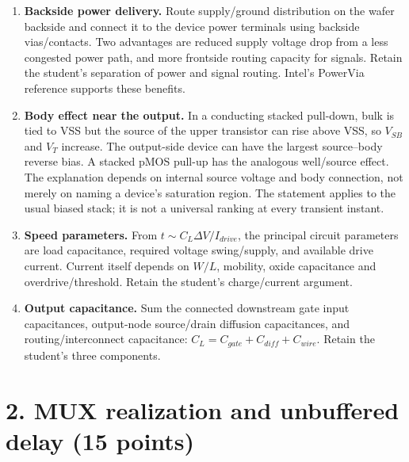\documentclass[10pt]{article}
\begin{document}
\begin{enumerate}[label=(\alph*),leftmargin=7mm,itemsep=6pt]
\item \textbf{Backside power delivery.} Route supply/ground distribution on the wafer backside and connect it to the device power terminals using backside vias/contacts. Two advantages are reduced supply voltage drop from a less congested power path, and more frontside routing capacity for signals. Retain the student's separation of power and signal routing. Intel's PowerVia reference supports these benefits.
\item \textbf{Body effect near the output.} In a conducting stacked pull-down, bulk is tied to VSS but the source of the upper transistor can rise above VSS, so $V_{SB}$ and $V_T$ increase. The output-side device can have the largest source--body reverse bias. A stacked pMOS pull-up has the analogous well/source effect. The explanation depends on internal source voltage and body connection, not merely on naming a device's saturation region. The statement applies to the usual biased stack; it is not a universal ranking at every transient instant.
\item \textbf{Speed parameters.} From $t\sim C_L\Delta V/I_{drive}$, the principal circuit parameters are load capacitance, required voltage swing/supply, and available drive current. Current itself depends on $W/L$, mobility, oxide capacitance and overdrive/threshold. Retain the student's charge/current argument.
\item \textbf{Output capacitance.} Sum the connected downstream gate input capacitances, output-node source/drain diffusion capacitances, and routing/interconnect capacitance: $C_L=C_{gate}+C_{diff}+C_{wire}$. Retain the student's three components.
\end{enumerate}
\newpage\section*{2. MUX realization and unbuffered delay (15 points)}
\end{document}
